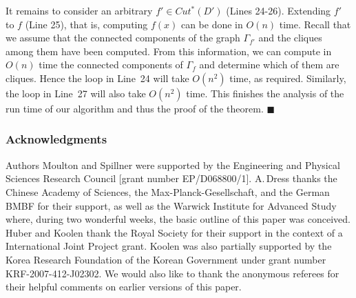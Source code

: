 \documentclass[12pt]{article}
\begin{document}
It remains to consider an arbitrary \(f' \in Cut^*(D')\) (Lines 24-26).
Extending \(f'\) to \(f\) (Line 25), that is, computing
\(f(x)\) can be done in \(O(n)\) time.
Recall that we assume that the connected components of the 
graph \(\Gamma_{f'}\) and the cliques among them have been computed.
From this information, we can compute in \(O(n)\) time
the connected components of \(\Gamma_f\) and determine which
of them are cliques. Hence the loop in Line~24 will take \(O(n^2)\) time,
as required. Similarly, the loop in Line~27 will also take \(O(n^2)\) time.
This finishes the analysis of the run time of our algorithm and thus the proof of
the theorem.
\hfill\(\blacksquare\)\\


\subsubsection*{Acknowledgments}
Authors Moulton and Spillner were supported by the 
Engineering and Physical Sciences Research Council 
[grant number EP/D068800/1].  
A.\,Dress thanks the Chinese Academy of Sciences, 
the Max-Planck-Gesellschaft, and the German BMBF for
their support, as well as the Warwick Institute for Advanced Study
where, during two wonderful weeks, the basic outline of this paper was
conceived. Huber and Koolen thank the Royal Society for their
support in the context of a International Joint Project
grant. Koolen was also partially supported by the Korea 
Research Foundation of the Korean Government under grant 
number KRF-2007-412-J02302. 
We would also like to thank the anonymous referees
for their helpful comments on earlier versions of
this paper.
\end{document}
